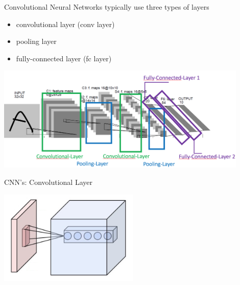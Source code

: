 \documentclass{beamer}
\begin{document}
\begin{frame}{Convolutional Neural Networks}
typically use three types of layers
\begin{itemize}
\item convolutional layer (conv layer)
\item pooling layer
\item fully-connected layer (fc layer)
\end{itemize}

\includegraphics[width=0.9\textwidth]{lenet2}
\end{frame}

\begin{frame}{CNN's: Convolutional Layer}
\begin{center}
\includegraphics[width=0.5\textwidth]{conv_layer}\\
\cite{ConvWiki}
\end{center}

\begin{itemize}
\end{itemize}
\end{frame}
\end{document}
